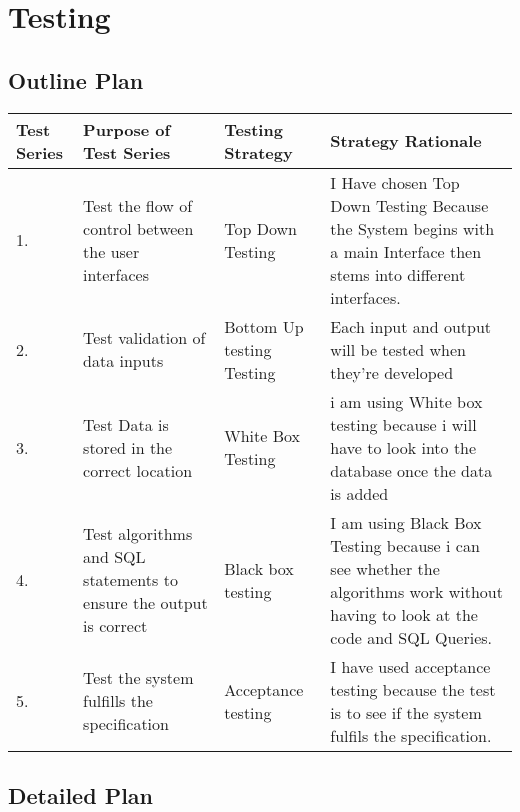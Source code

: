 \section{Testing}
\begin{landscape}

\subsection{Outline Plan}
\begin{center}
    \begin{tabular}{|p{2cm}|p{5cm}|p{5cm}|p{4cm}|}
        \hline

        \textbf{Test Series} & \textbf{Purpose of Test Series} & \textbf{Testing Strategy} & \textbf{Strategy Rationale}\\ \hline
	1. & Test the flow of control between the user interfaces & Top Down Testing & I Have chosen Top Down Testing Because the System begins with a main Interface then stems into different interfaces. \\ \hline
	2. & Test validation of data inputs & Bottom Up testing Testing &  Each input and output will be tested when they're developed\\ \hline
	3. & Test Data is stored in the correct location & White Box Testing & i am using White box testing because i will have to look into the database once the data is added \\ \hline
	4. & Test algorithms and SQL statements to ensure the output is correct & Black box testing & I am using Black Box Testing because i can see whether the algorithms work without having to look at the code and SQL Queries. \\ \hline
	5. & Test the system fulfills the specification & Acceptance testing & I have used acceptance testing because the test is to see if the system fulfils the specification. \\ \hline

    \end{tabular}
\end{center}

\subsection{Detailed Plan}
\pagebreak


\end{landscape}
